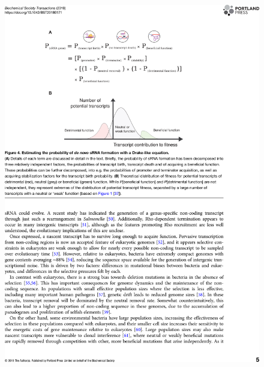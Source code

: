 \begin{figure}
    \centering
    \includegraphics[width=\linewidth]{lit_review/page5.png}
\end{figure}
